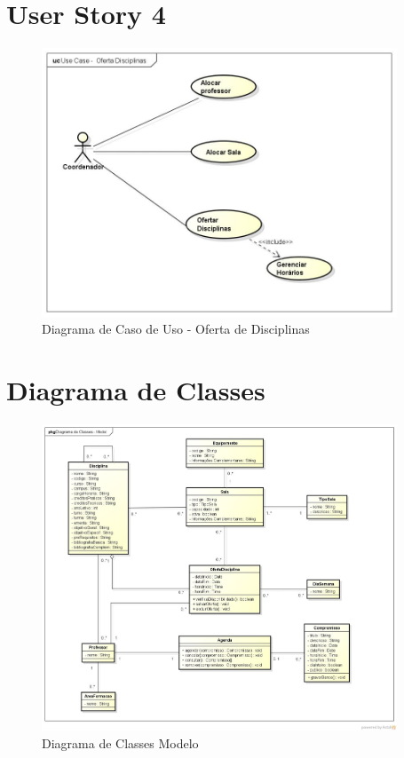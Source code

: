 \documentclass{abnt}
\begin{document}
	\section{User Story 4}
	
		\begin{figure}[h]
			\begin{center}
				 \includegraphics[width=400px]{casoUsoOfertaDisciplinas}
				 \caption{Diagrama de Caso de Uso - Oferta de Disciplinas}
				 \label{fig:casoUsoOfertaDisciplina}
			\end{center}
		\end{figure}
		\FloatBarrier
	
	\clearpage
	\section{Diagrama de Classes}
		
	
		\begin{figure}[h]
			\begin{center}
				 \includegraphics[width=400px]{classesmodelo}
				 \caption{Diagrama de Classes Modelo}
				 \label{fig:diagramaClassesModelo}
			\end{center}
		\end{figure}
		\FloatBarrier
\end{document}
